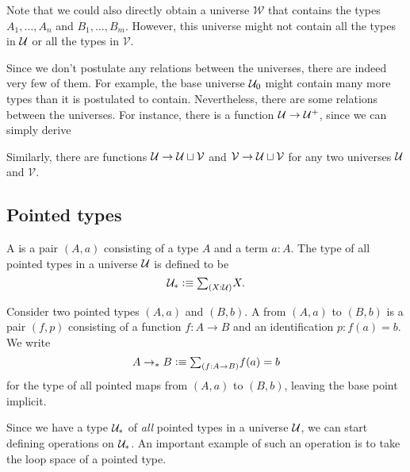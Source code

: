 \begin{rmk}
\begin{enumerate}
    Note that we could also directly obtain a universe $\mathcal{W}$ that contains the types $A_1,\ldots,A_n$ and $B_1,\ldots,B_m$. However, this universe might not contain all the types in $\UU$ or all the types in $\mathcal{V}$.
  \end{enumerate}
  Since we don't postulate any relations between the universes, there are indeed very few of them. For example, the base universe $\UU_0$ might contain many more types than it is postulated to contain. Nevertheless, there are some relations between the universes. For instance, there is a function $\UU\to\UU^+$, since we can simply derive
  \begin{prooftree}
  \end{prooftree}
  Similarly, there are functions $\UU\to \UU\sqcup\mathcal{V}$ and $\mathcal{V}\to \UU\sqcup\mathcal{V}$ for any two universes $\UU$ and $\mathcal{V}$.
\end{rmk}

\subsection{Pointed types}

\begin{defn}
  A  is a pair $(A,a)$ consisting of a type $A$ and a term $a:A$. The type of all pointed types in a universe $\UU$ is defined to be
  \begin{equation*}
    \UU_\ast \defeq \sm{X:\UU}X.
  \end{equation*}
\end{defn}

\begin{defn}
  Consider two pointed types $(A,a)$ and $(B,b)$. A  from $(A,a)$ to $(B,b)$ is a pair $(f,p)$ consisting of a function $f:A\to B$ and an identification $p:f(a)=b$. We write
  \begin{equation*}
    A\to_\ast B \defeq \sm{f:A\to B}f(a)=b
  \end{equation*}
  for the type of all pointed maps from $(A,a)$ to $(B,b)$, leaving the base point implicit.
\end{defn}

Since we have a type $\UU_\ast$ of \emph{all} pointed types in a universe $\UU$, we can start defining operations on $\UU_\ast$. An important example of such an operation is to take the loop space of a pointed type.

